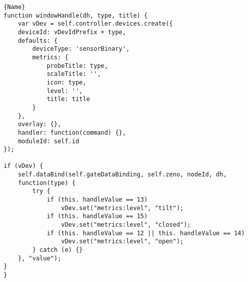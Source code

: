 \begin{lstlisting}[caption=Handle Device,basicstyle=\small,columns=fullflexible]{Name} 
function windowHandle(dh, type, title) {
	var vDev = self.controller.devices.create({
	deviceId: vDevIdPrefix + type,
	defaults: {
		deviceType: 'sensorBinary',
		metrics: {
			probeTitle: type,
			scaleTitle: '',
			icon: type,
			level: '',
			title: title
		}
	},
	overlay: {},
	handler: function(command) {},
	moduleId: self.id
});

if (vDev) {
	self.dataBind(self.gateDataBinding, self.zeno, nodeId, dh, 
	function(type) {
		try {
			if (this. handleValue == 13)
				vDev.set("metrics:level", "tilt");
			if (this. handleValue == 15)
				vDev.set("metrics:level", "closed");
			if (this. handleValue == 12 || this. handleValue == 14)
				vDev.set("metrics:level", "open");
		} catch (e) {}
	}, "value");
}
}
\end{lstlisting}